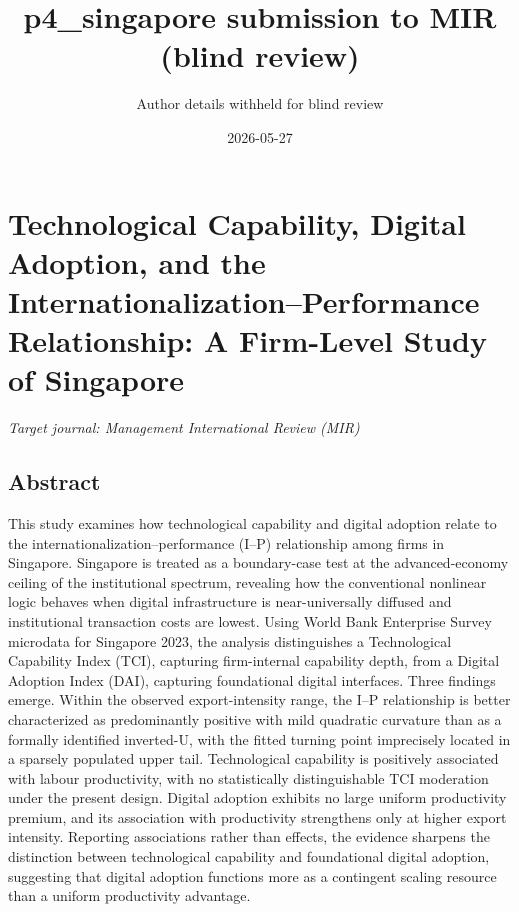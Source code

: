 \documentclass[12pt,a4paper]{article}
\title{p4\_singapore submission to MIR (blind review)}
\author{Author details withheld for blind review}
\date{2026-05-27}
\begin{document}
\maketitle

\hypertarget{technological-capability-digital-adoption-and-the-internationalizationperformance-relationship-a-firm-level-study-of-singapore}{%
\section{Technological Capability, Digital Adoption, and the
Internationalization--Performance Relationship: A Firm-Level Study of
Singapore}\label{technological-capability-digital-adoption-and-the-internationalizationperformance-relationship-a-firm-level-study-of-singapore}}

\emph{Target journal: Management International Review (MIR)}

\hypertarget{abstract}{%
\subsection{Abstract}\label{abstract}}

This study examines how technological capability and digital adoption
relate to the internationalization--performance (I--P) relationship
among firms in Singapore. Singapore is treated as a boundary-case test
at the advanced-economy ceiling of the institutional spectrum, revealing
how the conventional nonlinear logic behaves when digital infrastructure
is near-universally diffused and institutional transaction costs are
lowest. Using World Bank Enterprise Survey microdata for Singapore 2023,
the analysis distinguishes a Technological Capability Index (TCI),
capturing firm-internal capability depth, from a Digital Adoption Index
(DAI), capturing foundational digital interfaces. Three findings emerge.
Within the observed export-intensity range, the I--P relationship is
better characterized as predominantly positive with mild quadratic
curvature than as a formally identified inverted-U, with the fitted
turning point imprecisely located in a sparsely populated upper tail.
Technological capability is positively associated with labour
productivity, with no statistically distinguishable TCI moderation under
the present design. Digital adoption exhibits no large uniform
productivity premium, and its association with productivity strengthens
only at higher export intensity. Reporting associations rather than
effects, the evidence sharpens the distinction between technological
capability and foundational digital adoption, suggesting that digital
adoption functions more as a contingent scaling resource than a uniform
productivity advantage.
\end{document}
